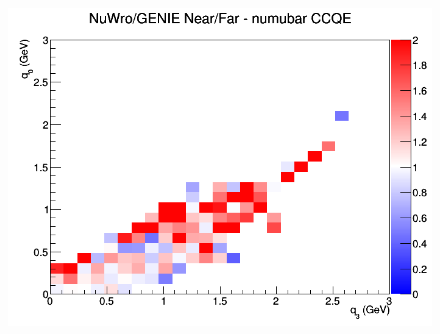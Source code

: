 \begin{figure}[h]
\endminipage
{}
\includegraphics[width=\linewidth]{eff_q0_q3/LAr/ratios/CCQE_NuWro_GENIE_numubar_NF_q3_q0.png}
\endminipage
\newline
\end{figure}
\clearpage

